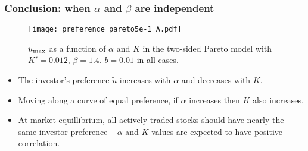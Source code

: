 \documentclass{beamer}
\begin{document}
\begin{frame}
  \frametitle{Conclusion: when $\alpha$ and  $\beta$ are independent}
  \begin{minipage}[t]{0.5\linewidth}
    \begin{figure}[htb!]
      \texttt{[image: preference\_pareto5e-1\_A.pdf]}
      \caption{\scriptsize
        $\tilde u_{\rm max}$ as a function of $\alpha$ and $K$
        in the two-sided Pareto model with $K'=0.012$, $\beta = 1.4$.
        $b = 0.01$ in all cases.
      }
    \end{figure}
  \end{minipage}\hfill
  \begin{minipage}[t]{0.5\linewidth}
    \begin{small}
      \begin{itemize}
      \item The investor's preference $\tilde u$ increases with $\alpha$ and
        decreases with $K$.
      \item Moving along a curve of equal preference, if $\alpha$
        increases then $K$ also increases.
      \item At market equillibrium, all actively traded stocks should
        have nearly the same investor preference -- $\alpha$ and
        $K$ values are expected to have positive correlation.
      \end{itemize}
    \end{small}
  \end{minipage}
\end{frame}
\end{document}
